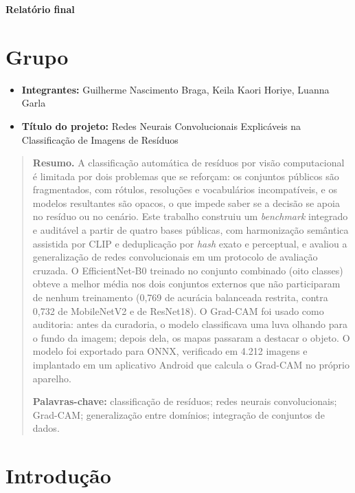 \documentclass[11pt,a4paper]{article}
\begin{document}
	
	\begin{center}
		{\Large\bfseries Relatório final}
	\end{center}
	\vspace{0.2em}
	
	\section*{Grupo}
	\begin{itemize}
		\item \textbf{Integrantes:} Guilherme Nascimento Braga, Keila Kaori Horiye, Luanna Garla
		\item \textbf{Título do projeto:} Redes Neurais Convolucionais Explicáveis na Classificação de Imagens de Resíduos
	\end{itemize}
	
	\begin{quote}
		\small
		\textbf{Resumo.} A classificação automática de resíduos por visão computacional é limitada por dois problemas que se reforçam: os conjuntos públicos são fragmentados, com rótulos, resoluções e vocabulários incompatíveis, e os modelos resultantes são opacos, o que impede saber se a decisão se apoia no resíduo ou no cenário. Este trabalho construiu um \textit{benchmark} integrado e auditável a partir de quatro bases públicas, com harmonização semântica assistida por CLIP e deduplicação por \textit{hash} exato e perceptual, e avaliou a generalização de redes convolucionais em um protocolo de avaliação cruzada. O EfficientNet-B0 treinado no conjunto combinado (oito classes) obteve a melhor média nos dois conjuntos externos que não participaram de nenhum treinamento (0,769 de acurácia balanceada restrita, contra 0,732 de MobileNetV2 e de ResNet18). O Grad-CAM foi usado como auditoria: antes da curadoria, o modelo classificava uma luva olhando para o fundo da imagem; depois dela, os mapas passaram a destacar o objeto. O modelo foi exportado para ONNX, verificado em 4.212 imagens e implantado em um aplicativo Android que calcula o Grad-CAM no próprio aparelho.
		
		\smallskip
		\noindent\textbf{Palavras-chave:} classificação de resíduos; redes neurais convolucionais; Grad-CAM; generalização entre domínios; integração de conjuntos de dados.
	\end{quote}
	
	\section{Introdução}
	
\end{document}

